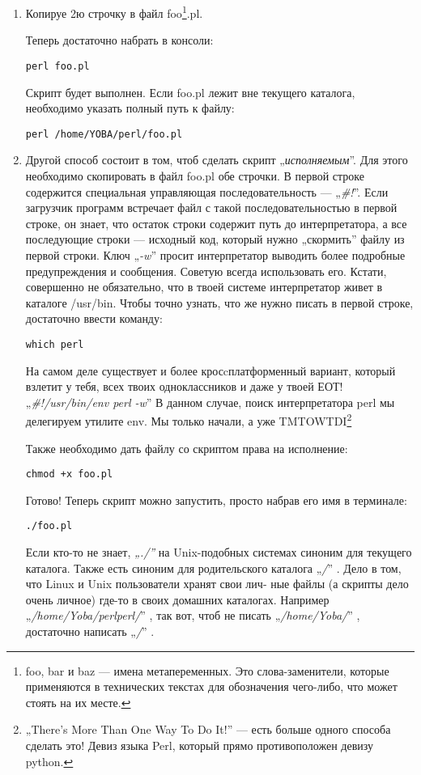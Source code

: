 \begin{enumerate}
\item Копируе 2ю строчку в файл foo\footnote{foo,
bar и baz --- имена метапеременных. Это слова-заменители, которые применяются
в технических текстах для обозначения чего-либо,
что может стоять на их месте.}.pl.

Теперь достаточно набрать в
консоли:

\texttt{perl foo.pl}

Скрипт будет выполнен. Если foo.pl лежит вне текущего каталога,
необходимо указать полный путь к файлу:

\texttt{perl /home/YOBA/perl/foo.pl}

\item Другой способ состоит в том, чтоб сделать скрипт „\emph{исполняемым}”.
Для этого необходимо скопировать в файл foo.pl обе строчки. В первой
строке содержится специальная управляющая последовательность —
„\emph{\#!}”. Если загрузчик программ встречает файл с такой последовательностью
в первой строке, он знает, что остаток строки содержит путь до интерпретатора,
а все последующие строки --- исходный код, который нужно „скормить” файлу из
первой строки.
Ключ „\emph{-w}” просит интерпретатор
выводить более подробные предупреждения и сообщения. Советую всегда
использовать его. Кстати, совершенно не обязательно, что в твоей
системе интерпретатор живет в каталоге /usr/bin. Чтобы точно узнать,
что же нужно писать в первой строке, достаточно ввести команду:

\texttt{which perl}

На самом деле существует и более кросcплатформенный вариант, который взлетит у тебя,
всех твоих одноклассников и даже у твоей ЕОТ!
„\emph{\#!/usr/bin/env perl -w}”
В данном случае, поиск интерпретатора perl мы делегируем утилите env. Мы только
начали, а уже TMTOWTDI\footnote{„There's More Than One Way To Do It!” ---
есть больше одного способа сделать это! Девиз языка Perl, который прямо противоположен
девизу python.}

Также необходимо дать файлу со скриптом права на исполнение:

\texttt{chmod +x foo.pl}

Готово! Теперь скрипт можно запустить, просто набрав его имя в терминале:

\texttt{./foo.pl}

Если кто-то не знает, \emph{„./”} на Unix-подобных системах синоним для
текущего каталога. Также есть синоним для родительского каталога
„\emph{/}” . Дело в том, что Linux и Unix пользователи хранят свои лич-
ные файлы (а скрипты дело очень личное) где-то в своих домашних
каталогах. Например „\emph{/home/Yoba/perlperl/}” , так вот, чтоб не писать
„\emph{/home/Yoba/}” , достаточно написать „\emph{/}” .


\end{enumerate}
